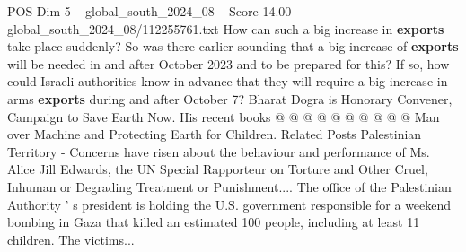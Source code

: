\begin{textsample}{POS Dim 5 – global\_south\_2024\_08 – Score 14.00 – global\_south\_2024\_08/112255761.txt}
How can such a big increase in \textbf{exports} take place suddenly?
So was there earlier sounding that a big increase of \textbf{exports} will be needed in and after October 2023 and to be prepared for this?
If so, how could Israeli authorities know in advance that they will require a big increase in arms \textbf{exports} during and after October 7?
Bharat Dogra is Honorary Convener, Campaign to Save Earth Now.
His recent books @ @ @ @ @ @ @ @ @ @ Man over Machine and Protecting Earth for Children.
Related Posts Palestinian Territory - Concerns have risen about the behaviour and performance of Ms.
Alice Jill Edwards, the UN Special Rapporteur on Torture and Other Cruel, Inhuman or Degrading Treatment or Punishment....
The office of the Palestinian Authority ' s president is holding the U.S. government responsible for a weekend bombing in Gaza that killed an estimated 100 people, including at least 11 children.
The victims...

\end{textsample}
